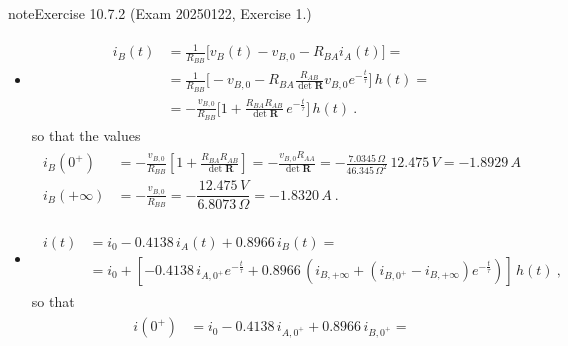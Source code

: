 \documentclass[letterpaper,10pt,italian]{jupyterBook}
\begin{document}
\begin{sphinxadmonition}{note}{Exercise 10.7.2 (Exam 2025\sphinxhyphen{}01\sphinxhyphen{}22, Exercise 1.)}
\begin{itemize}
\item {} 
\sphinxAtStartPar
{}
\begin{equation*}
\begin{split}\begin{aligned}
     i_B(t) 
     & = \frac{1}{R_{BB}} \bigg[ v_B(t) - v_{B,0} - R_{BA} i_A(t) \bigg] = \\
     & = \frac{1}{R_{BB}} \bigg[ - v_{B,0} - R_{BA} \frac{R_{AB}}{\det \mathbf{R}} v_{B,0} e^{-\frac{t}{\tau}} \bigg] \, h(t) = \\
     & = - \frac{v_{B,0}}{R_{BB}} \bigg[ 1 + \frac{R_{BA} R_{AB}}{\det \mathbf{R}} \, e^{-\frac{t}{\tau}} \bigg] \, h(t) \ .
   \end{aligned}\end{split}
\end{equation*}
\sphinxAtStartPar
so that the values
\begin{equation*}
\begin{split}\begin{aligned}
     i_B(0^+)     & = -\frac{v_{B,0}}{R_{BB}} \left[ 1 + \frac{R_{BA} R_{AB}}{\det \mathbf{R}} \right] = -\frac{v_{B,0} R_{AA}}{\det \mathbf{R}} =  - \frac{7.0345 \, \Omega}{46.345 \, \Omega^2} \, 12.475 \, V = - 1.8929 \, A \\
     i_B(+\infty) & = -\frac{v_{B,0}}{R_{BB}} = - \dfrac{12.475 \, V}{6.8073 \, \Omega} = -1.8320 \, A \ .
   \end{aligned}\end{split}
\end{equation*}
\item {} 
\sphinxAtStartPar
{}
\begin{equation*}
\begin{split}\begin{aligned}
     i(t)
     & = i_{0} - 0.4138 \, i_A(t) + 0.8966 \, i_B(t) = \\
     & = i_{0} + \left[ - 0.4138 \, i_{A,0^+} e^{-\frac{t}{\tau}}  + 0.8966 \, \left( i_{B,+\infty} + (i_{B,0^+} - i_{B,+\infty}) e^{-\frac{t}{\tau}} \right) \right] \, h(t) \ ,
   \end{aligned}\end{split}
\end{equation*}
\sphinxAtStartPar
so that
\begin{equation*}
\begin{split}\begin{aligned}
     i(0^+)     & = i_{0} - 0.4138 \, i_{A,0^+} + 0.8966 \, i_{B,0^+} = \\

\end{aligned}
\end{split}
\end{equation*}
\end{itemize}
\end{sphinxadmonition}
\end{document}
